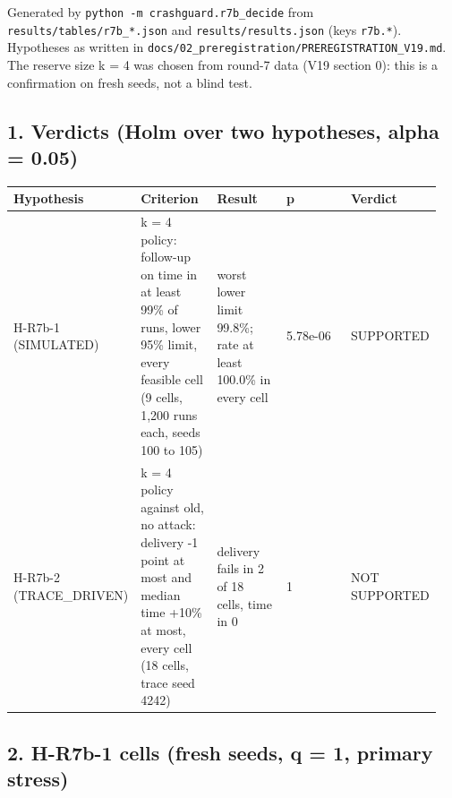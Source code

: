


Generated by \texttt{python -m crashguard.r7b\_decide} from \texttt{results/tables/r7b\_*.json} and \texttt{results/results.json} (keys \texttt{r7b.*}). Hypotheses as written in \texttt{docs/02\_preregistration/PREREGISTRATION\_V19.md}. The reserve size k = 4 was chosen from round-7 data (V19 section 0): this is a confirmation on fresh seeds, not a blind test.


\subsection*{1. Verdicts (Holm over two hypotheses, alpha = 0.05)}

{\scriptsize\raggedright
\begin{longtable}{p{0.190\linewidth}p{0.190\linewidth}p{0.190\linewidth}p{0.190\linewidth}p{0.190\linewidth}}
\toprule
Hypothesis & Criterion & Result & p & Verdict \\
\midrule
\endhead
H-R7b-1 (SIMULATED) & k = 4 policy: follow-up on time in at least 99\% of runs, lower 95\% limit, every feasible cell (9 cells, 1,200 runs each, seeds 100 to 105) & worst lower limit 99.8\%; rate at least 100.0\% in every cell & 5.78e-06 & SUPPORTED \\
H-R7b-2 (TRACE\_DRIVEN) & k = 4 policy against old, no attack: delivery -1 point at most and median time +10\% at most, every cell (18 cells, trace seed 4242) & delivery fails in 2 of 18 cells, time in 0 & 1 & NOT SUPPORTED \\
\bottomrule
\end{longtable}}

\subsection*{2. H-R7b-1 cells (fresh seeds, q = 1, primary stress)}

